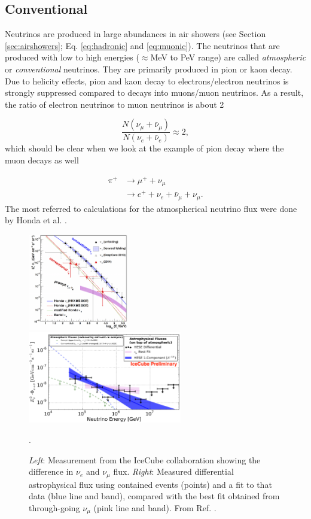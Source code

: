 \subsection{Conventional}
Neutrinos are produced in large abundances in air showers (see Section \ref{sec:airshowers}; Eq. \ref{eq:hadronic} and \ref{eq:muonic}). The neutrinos that are produced with low to high energies ($\approx$MeV to PeV range) are called \textit{atmospheric} or \textit{conventional} neutrinos. They are primarily produced in pion or kaon decay. Due to helicity effects, pion and kaon decay to electrons/electron neutrinos is strongly suppressed compared to decays into muons/muon neutrinos. As a result, the ratio of electron neutrinos to muon neutrinos is about 2

\begin{equation}
\frac{N\left( \nu_\mu + \bar{\nu}_\mu\right) }{N\left(\nu_e + \bar{\nu}_e\right)} \approx 2,
\end{equation}
which should be clear when we look at the example of pion decay where the muon decays as well

\begin{align}
\pi^+ &\rightarrow \mu^+ + \nu_\mu \nonumber \\
& \rightarrow e^+ + \nu_e + \bar{\nu}_\mu + \nu_\mu.
\end{align}
The most referred to calculations for the atmospherical neutrino flux were done by Honda et al. \cite{Honda:2006qj}.
\begin{figure}[t]
\centering
\includegraphics[width=0.39\textwidth]{chapter3/img/neutrinospectrum2.png}
\includegraphics[width=0.6\textwidth]{chapter3/img/astroflux.png}
\caption{\textit{Left}: Measurement from the IceCube collaboration showing the difference in $\nu_e$ and $\nu_\mu$ flux. \textit{Right}: Measured differential astrophysical flux using contained events (points) and a fit to that data (blue line and band), compared with the best fit obtained from through-going $\nu_\mu$ (pink line and band). From Ref. \cite{Aartsen:2017mau}.}.
\label{fig:neutrinospectrum2}
\end{figure}

